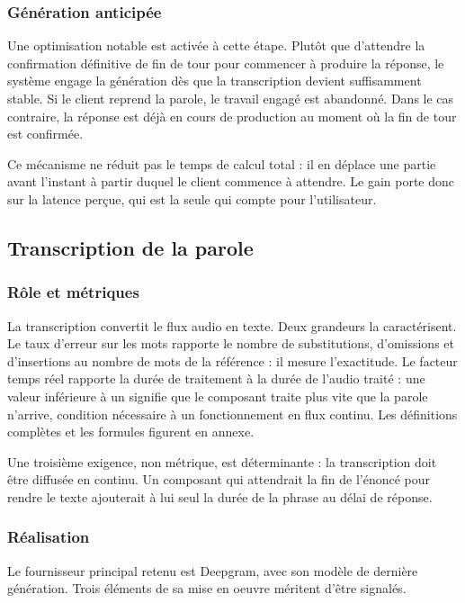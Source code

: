 \subsubsection{Génération anticipée}

Une optimisation notable est activée à cette étape. Plutôt que d'attendre la confirmation définitive de fin de tour pour commencer à produire la réponse, le système engage la génération dès que la transcription devient suffisamment stable. Si le client reprend la parole, le travail engagé est abandonné. Dans le cas contraire, la réponse est déjà en cours de production au moment où la fin de tour est confirmée.

Ce mécanisme ne réduit pas le temps de calcul total : il en déplace une partie avant l'instant à partir duquel le client commence à attendre. Le gain porte donc sur la latence perçue, qui est la seule qui compte pour l'utilisateur.

\subsection{Transcription de la parole}

\subsubsection{Rôle et métriques}

La transcription convertit le flux audio en texte. Deux grandeurs la caractérisent. Le taux d'erreur sur les mots rapporte le nombre de substitutions, d'omissions et d'insertions au nombre de mots de la référence : il mesure l'exactitude. Le facteur temps réel rapporte la durée de traitement à la durée de l'audio traité : une valeur inférieure à un signifie que le composant traite plus vite que la parole n'arrive, condition nécessaire à un fonctionnement en flux continu. Les définitions complètes et les formules figurent en annexe.

Une troisième exigence, non métrique, est déterminante : la transcription doit être diffusée en continu. Un composant qui attendrait la fin de l'énoncé pour rendre le texte ajouterait à lui seul la durée de la phrase au délai de réponse.

\subsubsection{Réalisation}

Le fournisseur principal retenu est Deepgram, avec son modèle de dernière génération. Trois éléments de sa mise en oeuvre méritent d'être signalés.

